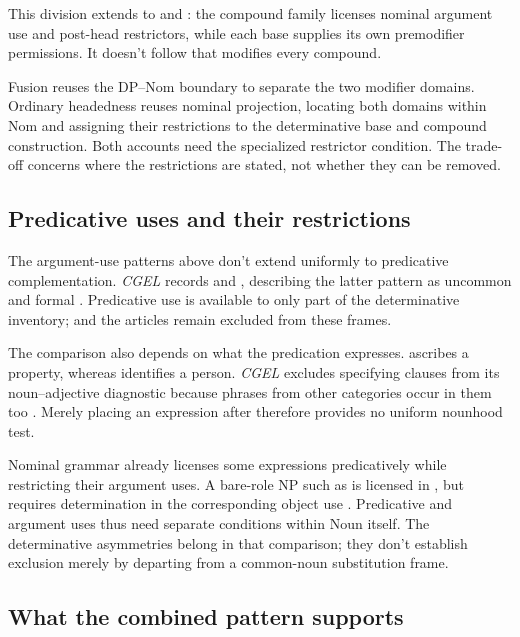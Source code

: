 \documentclass[12pt]{article}
\begin{document}
This division extends to  and : the compound family licenses nominal argument use and post-head restrictors, while each base supplies its own premodifier permissions. It doesn't follow that  modifies every compound.

Fusion reuses the DP--Nom boundary to separate the two modifier domains. Ordinary headedness reuses nominal projection, locating both domains within Nom and assigning their restrictions to the determinative base and compound construction. Both accounts need the specialized restrictor condition. The trade-off concerns where the restrictions are stated, not whether they can be removed.

\subsection{Predicative uses and their restrictions}\label{sec:predication}

The argument-use patterns above don't extend uniformly to predicative complementation. \textit{CGEL} records  and , describing the latter pattern as uncommon and formal \citep[392, 395--396]{huddleston2002}. Predicative use is available to only part of the determinative inventory;  and the articles remain excluded from these frames.

The comparison also depends on what the predication expresses.  ascribes a property, whereas  identifies a person. \textit{CGEL} excludes specifying  clauses from its noun--adjective diagnostic because phrases from other categories occur in them too \citep[536]{huddleston2002}. Merely placing an expression after  therefore provides no uniform nounhood test.

Nominal grammar already licenses some expressions predicatively while restricting their argument uses. A bare-role NP such as  is licensed in , but requires determination in the corresponding object use  \citep[328]{huddleston2002}. Predicative and argument uses thus need separate conditions within Noun itself. The determinative asymmetries belong in that comparison; they don't establish exclusion merely by departing from a common-noun substitution frame.

\subsection{What the combined pattern supports}\label{sec:cumulative}
\end{document}
